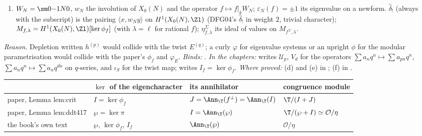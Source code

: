 \begin{convention}
\begin{enumerate}[label=(\alph*)]
for the set $S$. A parenthesised superscript is reserved for \emph{twists} of curves ($E^{(q)}$), for \emph{removing Euler factors}
($\zeta^{(N)}$, $\T^{(N)}$), for the \emph{level} of a Hecke operator when two levels are in play ($T_p^{(M)}$, $U_p^{(Mp)}$), and for the
components $\chi^{(p)}$ of a Dirichlet character; it never denotes depletion. The Frobenius twist of a curve is $C^{[r]}$.
\item $W_N=\sm0{-1}N0$, $w_N$ the involution of $X_0(N)$ and the operator $f\mapsto f|_kW_N$; $\varepsilon_N(f)=\pm1$ its eigenvalue on a newform.
$\hat\delta_!$ (always with the subscript) is the pairing $\langle x,w_Ny\rangle$ on $H^1(X_0(N),\Zl)$ (DFG04's $\hat\delta_!$ in weight $2$, trivial
character); $M_{f,\lambda}=H^1(X_0(N),\Zl)[\ker\phi_f]$ (with $\lambda=\ell$ for rational $f$); $\eta^\Sigma_{f,\lambda}$ its ideal of values on
$M_{f^\Sigma,\lambda}$.
\end{enumerate}
\end{convention}

\noindent\emph{Reason.} Depletion written $h^{(p)}$ would collide with the twist $E^{(q)}$; a curly $\varphi$ for eigenvalue systems
or an upright $\phi$ for the modular parametrisation would collide with the paper's $\phi_f$ and $\varphi_E$. \emph{Binds:}
. \emph{In the chapters:}
 writes $\mathcal U_p$, $V_d$ for the operators $\sum a_nq^n\mapsto\sum a_{pn}q^n$, $\sum a_nq^n\mapsto\sum a_nq^{dn}$ on
$q$-series, and $\iota_S$ for the twist map;  writes $I_f=\ker\phi_f$. \emph{Where proved:} (d) and (e) in
; (f) in .

\begin{center}\small
\begin{tabular}{@{}p{3.8cm}p{3.4cm}p{3.4cm}p{3.6cm}@{}}
\toprule
& $\ker$ of the eigencharacter & its annihilator & congruence module\\
\midrule
paper, Lemma lem:crit & $I=\ker\phi_f$ & $J=\Ann_\T(f^\perp)=\Ann_\T(I)$ & $\T/(I+J)$\\
paper, Lemma lem:ddt417 & $\wp=\ker\pi$ & $I=\Ann_\T(\wp)$ & $\T/(\wp+I)\simeq\mathcal O/\eta$\\
the book's own text & $\wp$, $\ker\phi_f$, $I_f$ & $\Ann_\T(\wp)$ & $\mathcal O/\eta$\\
\bottomrule
\end{tabular}
\end{center}

